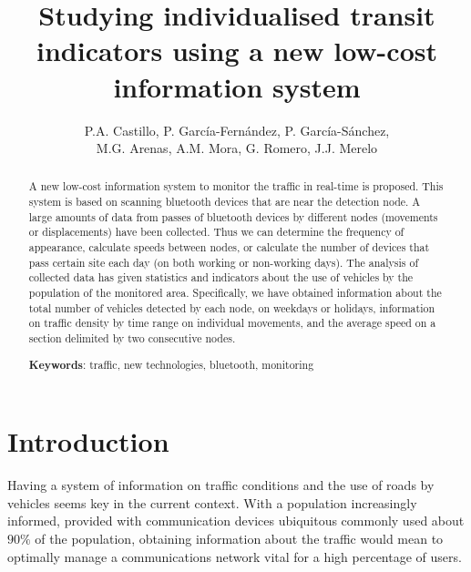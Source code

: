 \documentclass{llncs}
\title{Studying individualised transit indicators using a new low-cost information system}
\author {
P.A. Castillo, P. García-Fernández, P. García-Sánchez, \\ M.G. Arenas, A.M. Mora, G. Romero, J.J. Merelo
}
\institute{
Department of Architecture and Computer Technology. CITIC \\
University of Granada (Spain). {\tt pacv@ugr.es}
}
\date{}
\begin{document}
\renewcommand{\tablename}{Table }
\renewcommand{\figurename}{Figure }
\maketitle

\begin{abstract}

A new low-cost information system to monitor the traffic in real-time is proposed.
This system is based on scanning bluetooth devices that are near the detection node. 
A large amounts of data from passes of bluetooth devices by different nodes (movements or displacements) have been collected. 
Thus we can determine the frequency of appearance, calculate speeds between nodes, or calculate the number of devices that pass certain site each day (on both working or non-working days).
The analysis of collected data has given statistics and indicators about the use of vehicles by the population of the monitored area.
Specifically, we have obtained information about the total number of vehicles detected by each node, on weekdays or holidays, information on traffic density by time range on individual movements, and the average speed on a section delimited by two consecutive nodes.

{\bf Keywords}: traffic, new technologies, bluetooth, monitoring

\end{abstract}




\section{Introduction}

Having a system of information on traffic conditions and the use of roads by vehicles seems key in the current context. 
With a population increasingly informed, provided with communication devices ubiquitous commonly used about $ 90 \% $ of the population, obtaining information about the traffic would mean to optimally manage a communications network vital for a high percentage of users.
\end{document}
